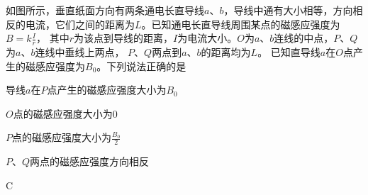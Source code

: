 如图所示，垂直纸面方向有两条通电长直导线\(a\)、\(b\)，导线中通有大小相等，方向相反的电流，它们之间的距离为\(L\)。已知通电长直导线周围某点的磁感应强度为\(B = k \frac{I}{r}\)， 其中\(r\)为该点到导线的距离，\(I\)为电流大小。\(O\)为\(a\)、\(b\)连线的中点，\(P\)、\(Q\)为\(a\)、\(b\)连线中垂线上两点， \(P\)、\(Q\)两点到\(a\)、\(b\)的距离均为\(L\)。 已知直导线\(a\)在\(O\)点产生的磁感应强度为\(B_0\)。下列说法正确的是\paren[]

\begin{choices}
    \item 导线\(a\)在\(P\)点产生的磁感应强度大小为\(B_0\)
    \item \(O\)点的磁感应强度大小为0
    \item \(P\)点的磁感应强度大小为\(\frac{B_0}{2}\)
    \item \(P\)、\(Q\)两点的磁感应强度方向相反
\end{choices}
\begin{answer}
    C
\end{answer}